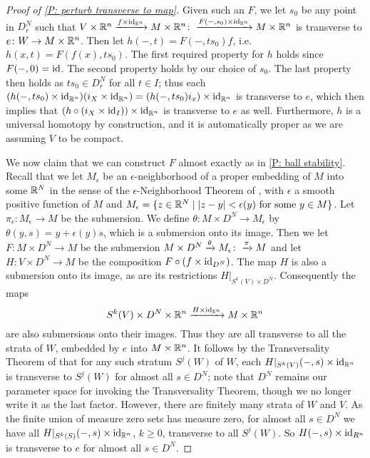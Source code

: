 \begin{proof}[Proof of \cref{P: perturb transverse to map}]
Given such an $F$, we let $s_0$ be any point in $D_r^N$ such that $V \times \mathbb{R}^n \xrightarrow{f \times \mathrm{id}_{\mathbb{R}^n}} M \times \mathbb{R}^n\colon\xrightarrow{F(-,s_0) \times \mathrm{id}_{\mathbb{R}^n}}M \times \mathbb{R}^n$ is transverse to $e \colon W \to M \times \mathbb{R}^n$. Then let $h(-,t) = F(-,ts_0)f$, i.e.\ $h(x,t) = F(f(x),ts_0)$. The first required property for $h$ holds since $F(-,0) = \mathrm{id}$. The second property holds by our choice of $s_0$. The last property then holds as $ts_0 \in D_r^N$ for all $t \in I$; thus each $(h(-,ts_0) \times \mathrm{id}_{\mathbb{R}^n})(i_X \times \mathrm{id}_{\mathbb{R}^n}) = (h(-,ts_0)i_x) \times \mathrm{id}_{\mathbb{R}^n}$ is transverse to $e$, which then implies that $(h\circ(i_{X} \times \mathrm{id}_I))\times\mathrm{id}_{\mathbb{R}^n}$ is transverse to $e$ as well. Furthermore, $h$ is a universal homotopy by construction, and it is automatically proper as we are assuming $V$ to be compact.

We now claim that we can construct $F$ almost exactly as in \cref{P: ball stability}. Recall that we let $M_\epsilon$ be an $\epsilon$-neighborhood of a proper embedding of $M$ into some $\mathbb{R}^N$ in the sense of the $\epsilon$-Neighborhood Theorem of \cite[Section 2.3]{GuPo74}, with $\epsilon$ a smooth positive function of $M$ and $M_\epsilon = \{z \in \mathbb{R}^N\mid |z-y|<\epsilon(y) \text{ for some }y \in M\}$.
Let $\pi_\epsilon: M_\epsilon \to M$ be the submersion.
We define $\theta: M \times D^N \to M_\epsilon$ by $\theta(y, s) = y + \epsilon(y) s$, which is a submersion onto its image.
Then we let $F \colon M \times D^N \to M$ be the submersion $M \times D^N \xrightarrow{\theta}M_\epsilon\colon\xrightarrow{\pi}M$ and let $H \colon V \times D^N \to M$ be the composition $F \circ (f \times \mathrm{id}_{D^N})$. The map $H$ is also a submersion onto its image, as are its restrictions $H|_{S^k(V) \times D^N}$.
Consequently the maps
$$S^k(V) \times D^N \times \mathbb{R}^n \xrightarrow{H \times \mathrm{id}_{\mathbb{R}^n}} M \times \mathbb{R}^n$$
are also submersions onto their images. Thus they are all transverse to all the strata of $W$, embedded by $e$ into $M \times \mathbb{R}^n$.
It follows by the Transversality Theorem of \cite[Section 2.3]{GuPo74} that for any such stratum $S^j(W)$ of $W$, each $H|_{S^k(V)}(-,s) \times \mathrm{id}_{\mathbb{R}^n}$ is transverse to $S^j(W)$ for almost all $s \in D^N$; note that $D^N$ remains our parameter space for invoking the Transversality Theorem, though we no longer write it as the last factor. However, there are finitely many strata of $W$ and $V$. As the finite union of measure zero sets has measure zero, for almost all $s \in D^N$ we have all $H|_{S^k(S)}(-,s) \times \mathrm{id}_{\mathbb{R}^n}$, $k\geq 0$, transverse to all $S^j(W)$. So $H(-,s) \times \mathrm{id}_{R^n}$ is transverse to $e$ for almost all $s \in D^N$.


\end{proof}
